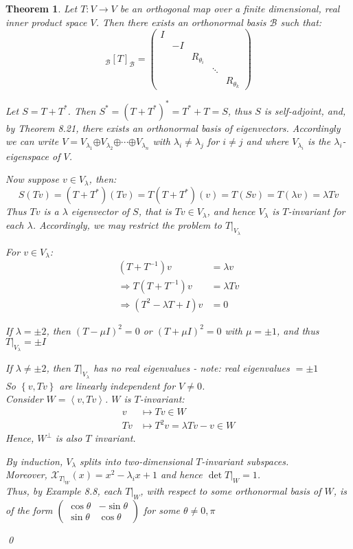 \documentclass[11pt, a4paper]{report}
\makeatletter
\numberwithin{equation}{section}
\renewcommand{\chi}{\mathcal{X}}
\newcommand{\opl}{\boldsymbol{\oplus}}
\newcommand{\B}{\mathcal{B}}
\newcommand{\spn}[1]{\left\langle #1 \right\rangle}
\newcommand{\sett}[1]{\left\lbrace #1 \right\rbrace}
\newcommand{\pmx}[1]{\begin{pmatrix}#1\end{pmatrix}}
\numberwithin{equation}{subsection}
\theoremstyle{plain}
\newtheorem{thm}{Theorem}[chapter] %
\theoremstyle{definition}
\theoremstyle{remark}
\newtheorem*{prf}{Proof}
\renewenvironment{prf}[1][\proofname]{\par
  \vspace{-\topsep}%
  \normalfont
  \topsep0pt \partopsep0pt %
  \trivlist
  \item[\hskip\labelsep
        \itshape
    #1\@addpunct{.}]\ignorespaces
}{%
  \popQED\endtrivlist\@endpefalse
  \addvspace{6pt plus 6pt} %
}
\newcommand{\pr}[1]{\begin{adjustwidth}{1cm}{} \begin{prf} #1 \end{prf} \end{adjustwidth}}
\makeatother
\begin{document}
\begin{thm}
Let $T: V \to V$ be an orthogonal map over a finite dimensional, real inner product space $V$. Then there exists an orthonormal basis $\B$ such that:
$$_\B[T]_\B = \pmx{I\\&-I\\&&R_{\theta_i}\\&&&\ddots\\&&&&R_{\theta_k}}$$
\pr{
Let $S = T + T^*$. Then $S^* = (T + T^*)^* = T^* + T = S$, thus $S$ is self-adjoint, and, by Theorem 8.21, there exists an orthonormal basis of eigenvectors. Accordingly we can write $V = V_{\lambda_1} \opl V_{\lambda_2} \opl \cdots \opl V_{\lambda_n}$ with $\lambda_i \neq \lambda_j$ for $i \neq j$ and where $V_{\lambda_i}$ is the $\lambda_i$-eigenspace of $V$.

Now suppose $v \in V_\lambda$, then:
$$S(Tv) = (T + T^*)(Tv) = T(T + T^*)(v) = T(Sv) = T(\lambda v) = \lambda Tv$$
Thus $Tv$ is a $\lambda$ eigenvector of $S$, that is $Tv \in V_\lambda$, and hence $V_\lambda$ is $T$-invariant for each $\lambda$. Accordingly, we may restrict the problem to $T|_{V_\lambda}$

For $v \in V_\lambda$:
\begin{align*}
(T + T^{-1})v	&= \lambda v\\
\Rightarrow T(T + T^{-1})v &= \lambda Tv\\
\Rightarrow (T^2 - \lambda T + I)v &= 0
\end{align*}

If $\lambda = \pm 2$, then $(T-\mu I)^2 = 0$ or $(T+ \mu I)^2 = 0$ with $\mu = \pm 1$, and thus $T|_{V_\lambda} = \pm I$

If $\lambda \neq \pm 2$, then $T|_{V_\lambda}$ has no real eigenvalues - note: real eigenvalues $= \pm 1$\\
So $\sett{v, Tv}$ are linearly independent for $V \neq 0$.\\ Consider $W = \spn{v, Tv}$. $W$ is $T$-invariant:
\begin{align*}
v &\mapsto Tv \in W\\
Tv &\mapsto T^2v = \lambda Tv - v \in W
\end{align*}
Hence, $W^\perp$ is also $T$ invariant. 

By induction, $V_\lambda$ splits into two-dimensional $T$-invariant subspaces.\\ Moreover, $\chi_{T|_W} (x) = x^2 - \lambda_i x + 1$ and hence $\det T|_W = 1$.\\ Thus, by Example 8.8, each $T|_W$, with respect to some orthonormal basis of $W$, is of the form $\pmx{\cos\theta & -\sin\theta \\ \sin\theta & \cos\theta}$ for some $\theta \neq 0, \pi$
}\qed
\end{thm}
\end{document}
